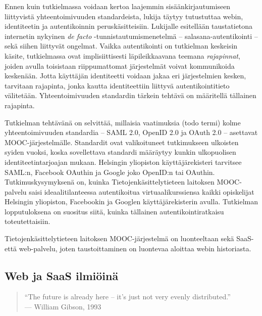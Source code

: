 \documentclass[finnish,gradu]{tktltiki}
\begin{document}
Ennen kuin tutkielmassa voidaan kertoa laajemmin sisäänkirjautumiseen liittyvistä yhteentoimivuuden standardeista, lukija täytyy tutustuttaa webin, identiteetin ja autentikoinnin peruskäsitteisiin. Lukijalle esitellään taustatietona internetin nykyinen \emph{de facto} -tunnistautumismenetelmä -- salasana-autentikointi -- sekä siihen liittyvät ongelmat. Vaikka autentikointi on tutkielman keskeisin käsite, tutkielmassa ovat implisiittisesti läpileikkaavana teemana \emph{rajapinnat}, joiden avulla toisistaan riippumattomat järjestelmät voivat kommunikoida keskenään. Jotta käyttäjän identiteetti voidaan jakaa eri järjestelmien kesken, tarvitaan rajapinta, jonka kautta identiteettiin liittyvä autentikointitieto välitetään. Yhteentoimivuuden standardin tärkein tehtävä on määritellä tällainen rajapinta.

Tutkielman tehtävänä on selvittää, millaisia vaatimuksia (todo termi) kolme yhteentoimivuuden standardia -- SAML 2.0, OpenID 2.0 ja OAuth 2.0 -- asettavat MOOC-järjestelmälle. Standardit ovat valikoituneet tutkimukseen ulkoisten syiden vuoksi, koska sovellettava standardi määräytyy kunkin ulkopuolisen identiteetintarjoajan mukaan. Helsingin yliopiston käyttäjärekisteri tarvitsee SAML:n, Facebook OAuthin ja Google joko OpenID:n tai OAuthin. Tutkimuskysymyksenä on, kuinka Tietojenkäsittelytieteen laitoksen MOOC-palvelu saisi ideaalitilanteessa autentikoitua virtuaalikurssiensa kaikki opiskelijat Helsingin yliopiston, Facebookin ja Googlen käyttäjärekisterin avulla. Tutkielman lopputuloksena on suositus siitä, kuinka tällainen autentikointiratkaisu toteutettaisiin.

Tietojenkäsittelytieteen laitoksen MOOC-järjestelmä on luonteeltaan sekä SaaS- että web-palvelu, joten taustoittaminen on luontevaa aloittaa webin historiasta.


\subsection{Web ja SaaS ilmiöinä} %

\label{sub:web_ja_saas}

  \begin{quote}
    ``The future is already here -- it's just not very evenly distributed.''
    \\ --- William Gibson, 1993
  \end{quote}
\end{document}
